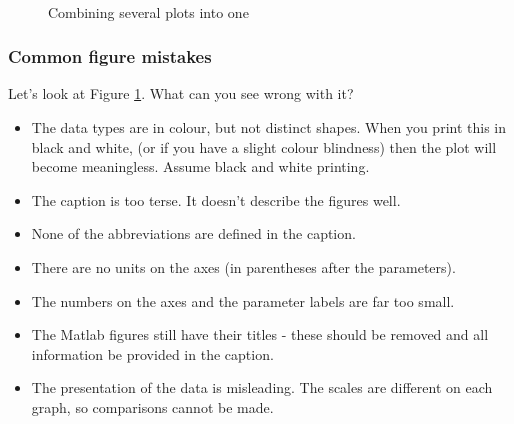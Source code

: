 \begin{figure}[tbp]
\begin{centering}
\caption{\label{fig:multiplots}Combining several plots into one}

\hspace{0.1in}
\\

\vspace{0.1in}

\hspace{0.1in}

\end{centering}
\end{figure}

\subsubsection{Common figure mistakes}

Let's look at Figure \ref{fig:multiplots}. What can you see wrong with it? 
\begin{itemize}
\item The data types are in colour, but not distinct shapes. When you print this in black and white, (or if you have a slight colour blindness) then the plot will become meaningless. Assume black and white printing. 
\item The caption is too terse. It doesn't describe the figures well.
\item None of the abbreviations are defined in the caption.
\item There are no units on the axes (in parentheses after the parameters).
\item The numbers on the axes and the parameter labels are far too small. 
\item The Matlab figures still have their titles - these should be removed and all information be provided in the caption. 
\item The presentation of the data is misleading. The scales are different on each graph, so comparisons cannot be made. 
\end{itemize}

